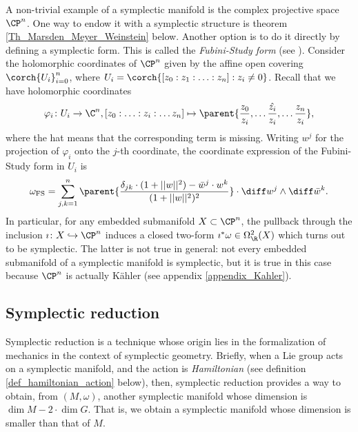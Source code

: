 \begin{example} \label{ex_Fubini_Study}
    A non-trivial example of a symplectic manifold is the complex projective space \(\CP^n\). One way to endow it with a symplectic structure is theorem \ref{Th_Marsden_Meyer_Weinstein} below. Another option is to do it directly by defining a symplectic form. This is called the \textit{Fubini-Study form} (see \parencite[Ex. 8.14]{lee_introCM}). Consider the holomorphic coordinates of \(\CP^n \) given by the affine open covering \(\corch{U_i}_{i=0}^n\), where \(U_i=\corch{[z_0:z_1:\ldots :z_n]: z_i \neq 0}\). Recall that we have holomorphic coordinates 
    \[
    \varphi_i\colon U_i \to \C^n, [z_0:\ldots :z_i: \ldots z_n] \mapsto \parent{\frac{z_0}{z_i}, \ldots \frac{\hat{z_i}}{z_i}, \ldots \frac{z_n}{z_i}},
    \]
    where the hat means that the corresponding term is missing. Writing \(w^j\) for the projection of \(\varphi_i\) onto the \(j\)-th coordinate, the coordinate expression of the Fubini-Study form in \(U_i\) is
    \begin{equation} \label{def_Fubini_Study}
    \omega_{\mathrm{FS}}=\sum_{j,k=1}^n \parent{\frac{\delta_{jk} \cdot (1+||w||^2)-\bar{w}^j \cdot w^k}{(1+||w||^2)^2}} \cdot \diff w^j \wedge \diff \bar{w}^k .
    \end{equation}
    In particular, for any embedded submanifold \(X \subset \CP^n\), the pullback through the inclusion \(\imath \colon X \hookrightarrow \CP^n\) induces a closed two-form \(\imath^*\omega\in \Omega_\R^2(X)\) which turns out to be symplectic. The latter is not true in general: not every embedded submanifold of a symplectic manifold is symplectic, but it is true in this case because \(\CP^n\) is actually Kähler (see appendix \ref{appendix_Kahler}).
\end{example}

\subsection{Symplectic reduction} \label{sec_symplectic_reduction}
Symplectic reduction is a technique whose origin lies in the formalization of mechanics in the context of symplectic geometry. Briefly, when a Lie group acts on a symplectic manifold, and the action is \textit{Hamiltonian} (see definition \ref{def_hamiltonian_action} below), then, symplectic reduction provides a way to obtain, from \((M, \omega)\), another symplectic manifold whose dimension is \(\dim M-2\cdot \dim G\). That is, we obtain a symplectic manifold whose dimension is smaller than that of \(M\).    

